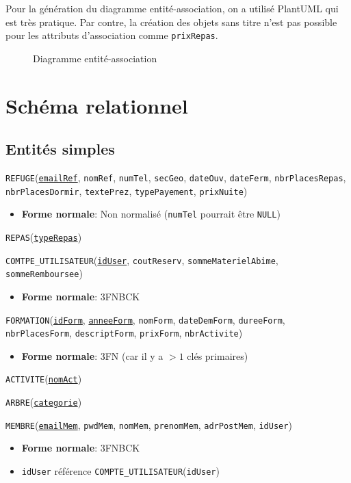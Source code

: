 \documentclass[12pt, a4paper]{article}
\newcommand\att[1]{\textnhtt{#1}}
\begin{document}
Pour la génération du diagramme entité-association, on a utilisé PlantUML qui est très pratique.
Par contre, la création des objets sans titre n'est pas possible pour les attributs d'association comme \att{prixRepas}.

\begin{figure}[H]

\caption{Diagramme entité-association}
\end{figure}

\section{Schéma relationnel}
\subsection*{Entités simples}
\att{REFUGE}(\att{\underline{emailRef}}, \att{nomRef}, \att{numTel}, \att{secGeo}, \att{dateOuv}, \att{dateFerm}, \att{nbrPlacesRepas}, \att{nbrPlacesDormir}, \att{textePrez}, \att{typePayement}, \att{prixNuite})
\begin{itemize}
\item \textbf{Forme normale}: Non normalisé (\att{numTel} pourrait être \att{NULL})
\end{itemize}

\att{REPAS}(\att{\underline{typeRepas}})

\att{COMTPE\_UTILISATEUR}(\att{\underline{idUser}}, \att{coutReserv}, \att{sommeMaterielAbime}, \att{sommeRemboursee})
\begin{itemize}
\item \textbf{Forme normale}: 3FNBCK
\end{itemize}

\att{FORMATION}(\att{\underline{idForm}}, \att{\underline{anneeForm}}, \att{nomForm}, \att{dateDemForm}, \att{dureeForm}, \att{nbrPlacesForm}, \att{descriptForm}, \att{prixForm}, \att{nbrActivite})
\begin{itemize}
\item \textbf{Forme normale}: 3FN (car il y a $>1$ clés primaires)
\end{itemize}

\att{ACTIVITE}(\att{\underline{nomAct}})

\att{ARBRE}(\att{\underline{categorie}})

\att{MEMBRE}(\att{\underline{emailMem}}, \att{pwdMem}, \att{nomMem}, \att{prenomMem}, \att{adrPostMem}, \att{idUser})
\begin{itemize}
\item \textbf{Forme normale}: 3FNBCK
\item \att{idUser} référence \att{COMPTE\_UTILISATEUR}(\att{idUser})
\end{itemize}
\end{document}
